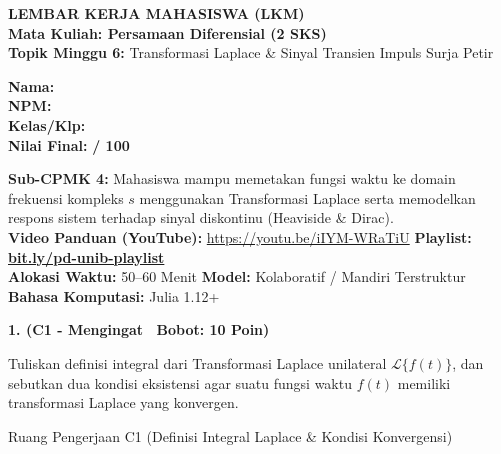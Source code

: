 \documentclass[10pt,a4paper]{article}
\begin{document}
\noindent\begin{minipage}[c]{0.68\textwidth}%
  {\large\textbf{\color{unibblue}LEMBAR KERJA MAHASISWA (LKM)}}\\[1mm]
  {\normalsize\textbf{Mata Kuliah: Persamaan Diferensial (2 SKS)}}\\[0.5mm]
  {\small\textbf{Topik Minggu 6:} Transformasi Laplace \& Sinyal Transien Impuls Surja Petir}%
\end{minipage}%
\hfill%
\begin{minipage}[c]{0.30\textwidth}%
  \begin{tcolorbox}[colback=unibblue!5,colframe=unibblue,boxrule=0.6pt,arc=2pt,left=4pt,right=4pt,top=2pt,bottom=2pt]
    \scriptsize
    \textbf{Nama:} \dotfill\\[1.2mm]
    \textbf{NPM:} \dotfill\\[1.2mm]
    \textbf{Kelas/Klp:} \dotfill\\[1.2mm]
    \textbf{Nilai Final:} \hfill \textbf{/ 100}
  \end{tcolorbox}%
\end{minipage}\par

\vspace{1.5mm}

\begin{tcolorbox}[colback=boxbg,colframe=unibgold!90!black,boxrule=0.6pt,arc=2pt,left=5pt,right=5pt,top=3pt,bottom=3pt,title=\textbf{\scriptsize Capaian Pembelajaran (Sub-CPMK 4) \& Pedoman Evaluasi OBE}]
  \scriptsize
  \textbf{Sub-CPMK 4:} Mahasiswa mampu memetakan fungsi waktu ke domain frekuensi kompleks $s$ menggunakan Transformasi Laplace serta memodelkan respons sistem terhadap sinyal diskontinu (Heaviside \& Dirac).\\
  \textbf{Video Panduan (YouTube):} \url{https://youtu.be/iIYM-WRaTiU} \hfill \textbf{Playlist:} \href{https://www.youtube.com/playlist?list=PLS5oOZWXZeTw}{\color{unibblue}\textbf{bit.ly/pd-unib-playlist}}\\\textbf{Alokasi Waktu:} 50--60 Menit \quad\textbar\quad \textbf{Model:} Kolaboratif / Mandiri Terstruktur \quad\textbar\quad \textbf{Bahasa Komputasi:} Julia 1.12+
\end{tcolorbox}

\vspace{1mm}

\noindent\textbf{1. (C1 - Mengingat \textbar\ Bobot: 10 Poin)}\par\vspace{0.5mm}
{\footnotesize Tuliskan definisi integral dari Transformasi Laplace unilateral $\mathcal{L}\{f(t)\}$, dan sebutkan dua kondisi eksistensi agar suatu fungsi waktu $f(t)$ memiliki transformasi Laplace yang konvergen.}
\begin{answerbox}{Ruang Pengerjaan C1 (Definisi Integral Laplace \& Kondisi Konvergensi)}
  \vspace{2.0cm}
\end{answerbox}
\end{document}
